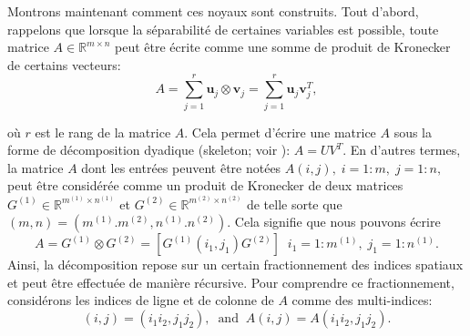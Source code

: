 \documentclass[11pt,a4paper,oneside]{book}
\def\R{\mathbb R}
\def\v{\mathbf v}
\def\u{\mathbf u}
\begin{document}
Montrons maintenant comment ces noyaux sont construits. Tout d'abord, rappelons que lorsque la séparabilité de certaines variables est possible, toute matrice $A \in \R^{m \times n}$ peut être écrite comme une somme de produit de Kronecker de certains vecteurs:
$$A = \sum_{j = 1}^r \u_j \otimes \v_j = \sum_{j = 1}^r\u_j\v_j^T,$$ 

où $ r $ est le rang de la matrice $ A $. Cela permet d'écrire une matrice $ A $ sous la forme de décomposition dyadique (skeleton; voir \cite[p.49]{olivier2017decompositions}): $A = UV^T.$ En d'autres termes, la matrice $ A $ dont les entrées peuvent être notées $A(i,j),\; i = 1:m,\; j=1:n,$ peut être considérée comme un produit de Kronecker de deux
matrices $G^{(1)}\in \R^{m^{(1)} \times n^{(1)} }$ et  $G^{(2)}\in \R^{m^{(2)} \times n^{(2)} }$  de telle sorte que $(m,n) = (m^{(1)}.m^{(2)},n^{(1)}.n^{(2)}).$ Cela signifie que nous pouvons écrire
\begin{equation}
A =  G^{(1)} \otimes G^{(2)} = [G^{(1)}(i_1,j_1)G^{(2)}]\;\; i_1 = 1:m^{(1)},\;j_1 = 1:n^{(1)}.
\end{equation}
Ainsi, la décomposition repose sur un certain fractionnement des indices spatiaux et peut être effectuée de manière récursive. Pour comprendre ce fractionnement, considérons les indices de ligne et de colonne de $ A $ comme des multi-indices:
$$(i,j) = (i_1i_2,j_1j_2),\;\;\text{and}\;\;A(i,j) = A(i_1i_2,j_1j_2). $$
\end{document}
